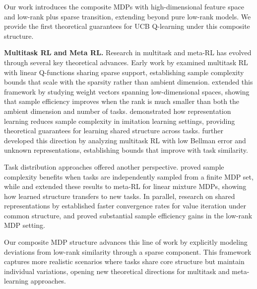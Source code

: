 Our work introduces the composite MDPs with high-dimensional feature space and low-rank plus sparse transition, extending beyond pure low-rank models. We provide the first theoretical guarantees for UCB Q-learning under this composite structure.

\smallskip
\noindent
\textbf{Multitask RL and Meta RL.}
Research in multitask and meta-RL has evolved through several key theoretical advances. Early work by \cite{calandriello2014sparse} examined multitask RL with linear Q-functions sharing sparse support, establishing sample complexity bounds that scale with the sparsity rather than ambient dimension. \cite{hu2021near} extended this framework by studying weight vectors spanning low-dimensional spaces, showing that sample efficiency improves when the rank is much smaller than both the ambient dimension and number of tasks. \cite{arora2020provable} demonstrated how representation learning reduces sample complexity in imitation learning settings, providing theoretical guarantees for learning shared structure across tasks. \cite{lu2022provable} further developed this direction by analyzing multitask RL with low Bellman error and unknown representations, establishing bounds that improve with task similarity.

Task distribution approaches offered another perspective. \cite{brunskill2013sample} proved sample complexity benefits when tasks are independently sampled from a finite MDP set, while \cite{pacchiano2022joint} and \cite{muller2022meta} extended these results to meta-RL for linear mixture MDPs, showing how learned structure transfers to new tasks. In parallel, research on shared representations by \cite{d2020sharing} established faster convergence rates for value iteration under common structure, and \cite{lu2021power} proved substantial sample efficiency gains in the low-rank MDP setting.

Our composite MDP structure advances this line of work by explicitly modeling deviations from low-rank similarity through a sparse component. This framework captures more realistic scenarios where tasks share core structure but maintain individual variations, opening new theoretical directions for multitask and meta-learning approaches.